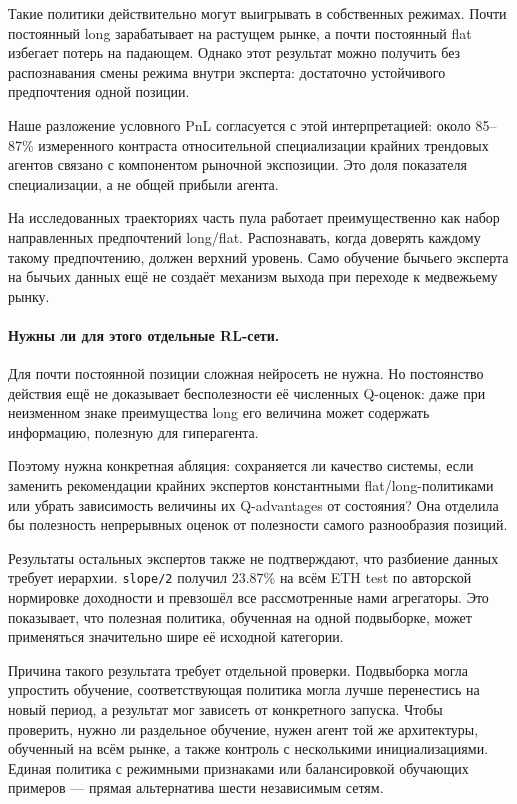 \documentclass[9pt,a4paper,twocolumn]{extarticle}
\begin{document}
Такие политики действительно могут выигрывать в собственных режимах. Почти постоянный long
зарабатывает на растущем рынке, а почти постоянный flat избегает потерь на падающем. Однако этот
результат можно получить без распознавания смены режима внутри эксперта: достаточно устойчивого
предпочтения одной позиции.

Наше разложение условного PnL согласуется с этой интерпретацией: около 85--87\% измеренного
контраста относительной специализации крайних трендовых агентов связано с компонентом рыночной
экспозиции. Это доля показателя специализации, а не общей прибыли агента.

На исследованных траекториях часть пула работает преимущественно как набор направленных
предпочтений long/flat. Распознавать, когда доверять каждому такому предпочтению, должен верхний
уровень. Само обучение бычьего эксперта на бычьих данных ещё не создаёт механизм выхода при
переходе к медвежьему рынку.

\paragraph{Нужны ли для этого отдельные RL-сети.}

Для почти постоянной позиции сложная нейросеть не нужна. Но постоянство действия ещё не
доказывает бесполезности её численных Q-оценок: даже при неизменном знаке преимущества long его
величина может содержать информацию, полезную для гиперагента.

Поэтому нужна конкретная абляция: сохраняется ли качество системы, если заменить рекомендации
крайних экспертов константными flat/long-политиками или убрать зависимость величины их
Q-advantages от состояния? Она отделила бы полезность непрерывных оценок от полезности самого
разнообразия позиций.

Результаты остальных экспертов также не подтверждают, что разбиение данных требует иерархии.
\texttt{slope/2} получил $23.87\%$ на всём ETH test по авторской нормировке доходности и
превзошёл все рассмотренные нами агрегаторы. Это показывает, что полезная политика, обученная на
одной подвыборке, может применяться значительно шире её исходной категории.

Причина такого результата требует отдельной проверки. Подвыборка могла упростить обучение,
соответствующая политика могла лучше перенестись на новый период, а результат мог зависеть от
конкретного запуска. Чтобы проверить, нужно ли раздельное обучение, нужен агент той же
архитектуры, обученный на всём рынке, а также контроль с несколькими инициализациями. Единая
политика с режимными признаками или балансировкой обучающих примеров --- прямая альтернатива
шести независимым сетям.
\end{document}
